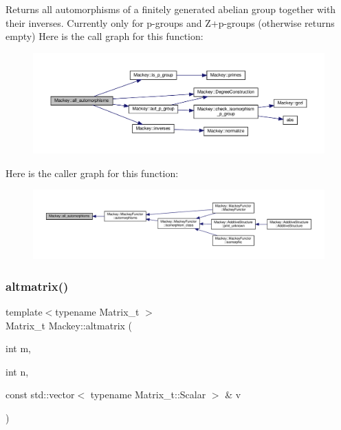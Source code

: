 Returns all automorphisms of a finitely generated abelian group together with their inverses. Currently only for p-\/groups and Z+p-\/groups (otherwise returns empty) Here is the call graph for this function\+:\nopagebreak
\begin{figure}[H]
\begin{center}
\leavevmode
\includegraphics[width=350pt]{namespaceMackey_a2556e2a1f78783585df78de1c1b35eae_cgraph}
\end{center}
\end{figure}
Here is the caller graph for this function\+:\nopagebreak
\begin{figure}[H]
\begin{center}
\leavevmode
\includegraphics[width=350pt]{namespaceMackey_a2556e2a1f78783585df78de1c1b35eae_icgraph}
\end{center}
\end{figure}
\mbox{\label{namespaceMackey_a26a529f63caac9c5b4dc809e0e5831be}} 
\subsubsection{\texorpdfstring{altmatrix()}{altmatrix()}}
{\footnotesize\ttfamily template$<$typename Matrix\+\_\+t $>$ \\
Matrix\+\_\+t Mackey\+::altmatrix (\begin{DoxyParamCaption}\item[{int}]{m,  }\item[{int}]{n,  }\item[{const std\+::vector$<$ typename Matrix\+\_\+t\+::\+Scalar $>$ \&}]{v }\end{DoxyParamCaption})}



